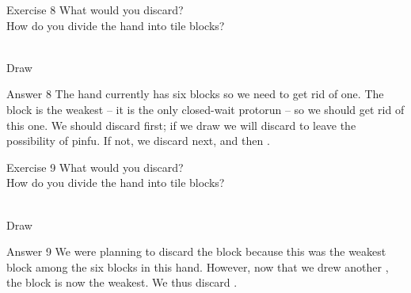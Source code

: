 \bigskip

\begin{itembox}[l]{Exercise 8}
What would you discard? \\
\vsp
How do you divide the hand into tile blocks? 

\bp
{}~\\
\hfill\footnotesize{Draw~~~~~~~~~~~}
\ep
\end{itembox}

\newpage

\begin{itembox}[r]{Answer 8}
\emj
The hand currently has six blocks so we need to get rid of one. The {\LARGE{}} block is the weakest -- it is the only closed-wait protorun -- so we should get rid of this one. We should discard {\LARGE{}} first; if we draw {\LARGE{}} we will discard {\LARGE{}} to leave the possibility of {\jap pinfu}. If not, we discard {\LARGE{}} next, and then  {\LARGE{}}. 
\end{itembox}

\vfill

\begin{itembox}[l]{Exercise 9}
What would you discard? \\
\vsp
How do you divide the hand into tile blocks? 

\bp
{}\bai\bai~\\
\hfill\footnotesize{Draw~~~~~~~~~~}
\ep
\end{itembox}

\newpage

\begin{itembox}[r]{Answer 9}
\emj
We were planning to discard the {\LARGE{}} block because this was the weakest block among the six blocks in this hand. However, now that we drew another {\LARGE{}}, the {\LARGE{}} block is now the weakest. We thus discard {\LARGE{}}.
\end{itembox}

